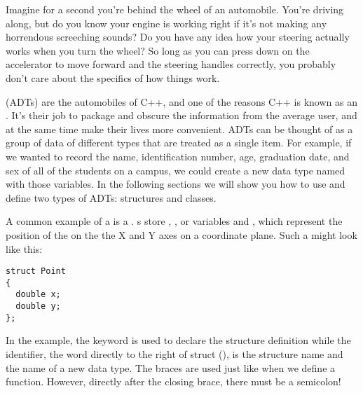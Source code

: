 

Imagine for a second you're behind the wheel of an automobile. 
You're driving along, but do you know your engine is working right if it's not making any horrendous screeching sounds? 
Do you have any idea how your steering actually works when you turn the wheel? 
So long as you can press down on the accelerator to move forward and the steering handles correctly, you probably don't care about the specifics of how things work.

 (ADTs) are the automobiles of C++, and one of the reasons C++ is known as an . 
It's their job to package and obscure the information from the average user, and at the same time make their lives more convenient.
ADTs can be thought of as a group of data of different types that are treated as a single item.
For example, if we wanted to record the name, identification number, age, graduation date, and sex of all of the students on a campus, we could create a new data type named  with those variables.
In the following sections we will show you how to use and define two types of ADTs: structures and classes. 



A common example of a  is a . s store , , or  variables  and , which represent the position of the  on the the X and Y axes on a coordinate plane. 
Such a  might look like this:

\noindent\begin{minipage}{\linewidth}\begin{lstlisting}
struct Point
{
  double x;
  double y;
};
\end{lstlisting}\end{minipage}

In the example, the keyword  is used to declare the structure definition while the identifier, the word directly to the right of struct (), is the structure name and the name of a new data type.
The braces are used just like when we define a function.
However, directly after the closing brace, there must be a semicolon!


